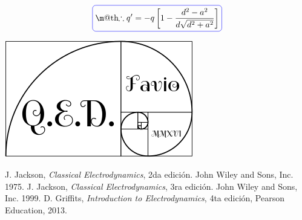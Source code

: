 \documentclass[a4paper,11pt]{article}
\makeatletter
\numberwithin{equation}{section}
\newcommand*{\boxcolor}{blue}
\renewcommand{\boxed}[1]{\textcolor{\boxcolor}{%
\tikz[baseline={([yshift=-1ex]current bounding box.center)}] \node [rectangle, minimum width=1ex,rounded corners,draw] {\normalcolor\m@th$\displaystyle#1$};}}
\makeatother
\begin{document}
\begin{equation}
 \boxed{\therefore q' = -q\left[1 - \frac{d^2 - a^2}{d\sqrt{d^2 + a^2}} \right]}
\end{equation}

\hspace{10cm}\includegraphics[scale=0.2]{logoQED}

\begin{thebibliography}{10}
J. Jackson, \emph{Classical Electrodynamics}, 2da edición. John Wiley and Sons, Inc. 
1975.
J. Jackson, \emph{Classical Electrodynamics}, 3ra edición. John Wiley and Sons, Inc. 
1999.
D. Griffits, \emph{Introduction to Electrodynamics}, 4ta edición, Pearson Education, 
2013.
\end{thebibliography}
\end{document}
